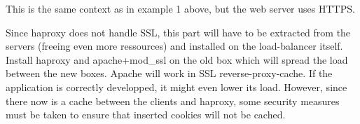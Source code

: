 This is the same context as in example 1 above, but the web
server uses HTTPS.

\begin{figure}[!ht]
  \centering

\end{figure}

Since haproxy does not handle SSL, this part will have to be extracted from the
servers (freeing even more ressources) and installed on the load-balancer
itself. Install haproxy and apache+mod\_ssl on the old box which will spread the
load between the new boxes. Apache will work in SSL reverse-proxy-cache. If the
application is correctly developped, it might even lower its load. However,
since there now is a cache between the clients and haproxy, some security
measures must be taken to ensure that inserted cookies will not be cached.

